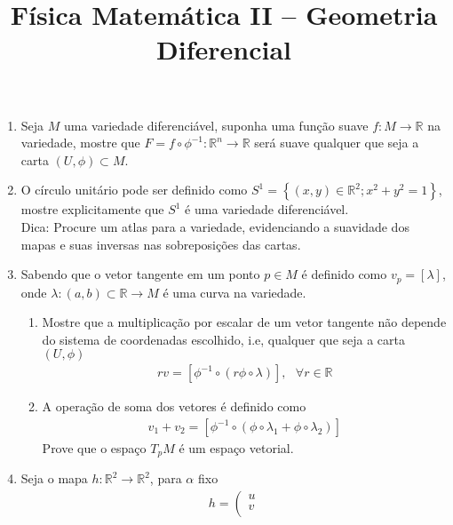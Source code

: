 \newif\ifuseseminar
\useseminartrue


\title{Física Matemática II -- Geometria Diferencial}	



\begin{enumerate}
	\item Seja $M$ uma variedade diferenciável, suponha uma função suave $f:M\rightarrow
		      \mathbb{R}$ na variedade, mostre que $F=f\circ \phi^{-1}:\mathbb{R}^n\rightarrow
		      \mathbb{R}$ será suave qualquer que seja a carta $(U,\phi)\subset M$.
	\item O círculo unitário pode ser definido como $S^1=\left\{(x,y)\in \mathbb{R}^2;
		      x^2+y^2=1\right\}$, mostre explicitamente que $S^1$ é uma variedade
	      diferenciável.\vspace{-0.4cm}\\
	      Dica: Procure um atlas para a variedade, evidenciando a suavidade dos mapas e suas
	      inversas nas sobreposições das cartas.
	\item Sabendo que o vetor tangente em um ponto $p\in M$ é definido como
	      $v_p=[\lambda]$, onde $\lambda:(a,b)\subset \mathbb{R}\rightarrow M$ é uma curva na
	      variedade.
	      \begin{enumerate}
		      \item Mostre que a multiplicação por escalar de um vetor tangente não depende do
		            sistema de coordenadas escolhido, i.e, qualquer que seja a carta $(U,\phi)$
		            \begin{align}
			            rv=[\phi^{-1}\circ(r\phi\circ \lambda)], \ \ \ \forall r\in \mathbb{R}
		            \end{align}
		      \item A operação de soma dos vetores é definido como
		            \begin{align}
			            v_1+v_2=[\phi^{-1}\circ(\phi\circ\lambda_1+\phi\circ\lambda_2)]
		            \end{align}
		            Prove que o espaço $T_pM$ é um espaço vetorial.
	      \end{enumerate}
	\item Seja o mapa $h:\mathbb{R}^2\rightarrow\mathbb{R}^2$, para $\alpha$ fixo
	      \begin{align}
		      h=	\left(\begin{matrix}
			               u \\
			               v \\

\end{matrix}
\end{align}
\end{enumerate}
